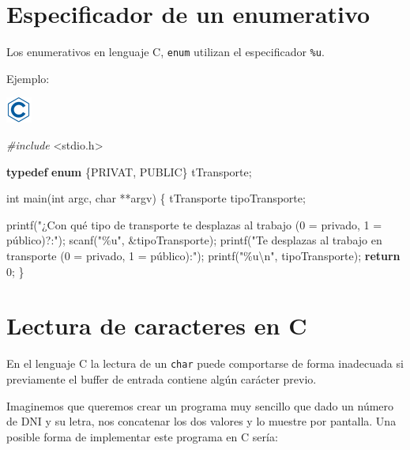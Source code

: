 \documentclass[
]{book}
\newenvironment{Shaded}{\begin{snugshade}}{\end{snugshade}}
\newcommand{\ControlFlowTok}[1]{\textcolor[rgb]{0.13,0.29,0.53}{\textbf{#1}}}
\newcommand{\DataTypeTok}[1]{\textcolor[rgb]{0.13,0.29,0.53}{#1}}
\newcommand{\DecValTok}[1]{\textcolor[rgb]{0.00,0.00,0.81}{#1}}
\newcommand{\ImportTok}[1]{#1}
\newcommand{\KeywordTok}[1]{\textcolor[rgb]{0.13,0.29,0.53}{\textbf{#1}}}
\newcommand{\NormalTok}[1]{#1}
\newcommand{\PreprocessorTok}[1]{\textcolor[rgb]{0.56,0.35,0.01}{\textit{#1}}}
\newcommand{\SpecialCharTok}[1]{\textcolor[rgb]{0.00,0.00,0.00}{#1}}
\newcommand{\StringTok}[1]{\textcolor[rgb]{0.31,0.60,0.02}{#1}}
\begin{document}
\hypertarget{especificador-de-un-enumerativo}{%
\section{Especificador de un enumerativo}\label{especificador-de-un-enumerativo}}

Los enumerativos en lenguaje C, \texttt{enum} utilizan el especificador \texttt{\%u}.

Ejemplo:

\includegraphics{./img/c.png}

\begin{Shaded}
\begin{Highlighting}[]
\PreprocessorTok{\#include }\ImportTok{\textless{}stdio.h\textgreater{}}

\KeywordTok{typedef} \KeywordTok{enum}\NormalTok{ \{PRIVAT, PUBLIC\} tTransporte;}

\DataTypeTok{int}\NormalTok{ main(}\DataTypeTok{int}\NormalTok{ argc, }\DataTypeTok{char}\NormalTok{ **argv) \{}
\NormalTok{    tTransporte tipoTransporte;}

\NormalTok{    printf(}\StringTok{"¿Con qué tipo de transporte te desplazas al trabajo (0 = privado, 1 = público)?:"}\NormalTok{);}
\NormalTok{    scanf(}\StringTok{"\%u"}\NormalTok{, \&tipoTransporte);}
\NormalTok{    printf(}\StringTok{"Te desplazas al trabajo en transporte (0 = privado, 1 = público):"}\NormalTok{);}
\NormalTok{    printf(}\StringTok{"\%u}\SpecialCharTok{\textbackslash{}n}\StringTok{"}\NormalTok{, tipoTransporte);}
    \ControlFlowTok{return} \DecValTok{0}\NormalTok{;}
\NormalTok{\}}
\end{Highlighting}
\end{Shaded}

\hypertarget{lectura-de-caracteres-en-c}{%
\section{Lectura de caracteres en C}\label{lectura-de-caracteres-en-c}}

En el lenguaje C la lectura de un \texttt{char} puede comportarse de forma inadecuada si previamente el buffer de entrada contiene algún carácter previo.

Imaginemos que queremos crear un programa muy sencillo que dado un número de DNI y su letra, nos concatenar los dos valores y lo muestre por pantalla. Una posible forma de implementar este programa en C sería:
\end{document}

